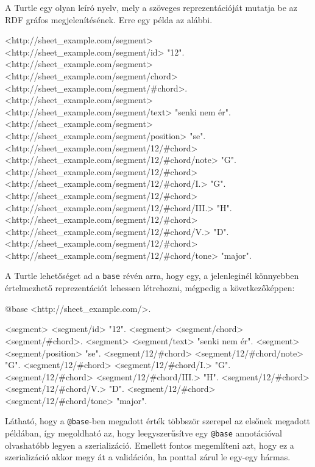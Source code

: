 A Turtle egy olyan leíró nyelv, mely a szöveges reprezentációját mutatja be az RDF gráfos megjelenítésének.
Erre egy példa az alábbi.
\begin{xml}
<http://sheet_example.com/segment> <http://sheet_example.com/segment/id> "12".
<http://sheet_example.com/segment> <http://sheet_example.com/segment/chord> <http://sheet_example.com/segment/#chord>.
<http://sheet_example.com/segment> <http://sheet_example.com/segment/text> "senki nem ér".
<http://sheet_example.com/segment> <http://sheet_example.com/segment/position> "se".
<http://sheet_example.com/segment/12/#chord> <http://sheet_example.com/segment/12/#chord/note> "G".
<http://sheet_example.com/segment/12/#chord> <http://sheet_example.com/segment/12/#chord/I.> "G".
<http://sheet_example.com/segment/12/#chord> <http://sheet_example.com/segment/12/#chord/III.> "H".
<http://sheet_example.com/segment/12/#chord> <http://sheet_example.com/segment/12/#chord/V.> "D".
<http://sheet_example.com/segment/12/#chord> <http://sheet_example.com/segment/12/#chord/tone> "major".
\end{xml}

A Turtle lehetőséget ad a \texttt{base} révén arra, hogy egy, a jelenleginél könnyebben értelmezhető reprezentációt lehessen létrehozni, mégpedig a következőképpen:
\begin{xml}
@base <http://sheet_example.com/>.

<segment> <segment/id> "12".
<segment> <segment/chord> <segment/#chord>.
<segment> <segment/text> "senki nem ér".
<segment> <segment/position> "se".
<segment/12/#chord> <segment/12/#chord/note> "G".
<segment/12/#chord> <segment/12/#chord/I.> "G".
<segment/12/#chord> <segment/12/#chord/III.> "H".
<segment/12/#chord> <segment/12/#chord/V.> "D".
<segment/12/#chord> <segment/12/#chord/tone> "major".
\end{xml}
Látható, hogy a \texttt{@base}-ben megadott érték többször szerepel az elsőnek megadott példában, így megoldható az, hogy leegyszerűsítve egy \texttt{@base} annotációval olvashatóbb legyen a szerializáció. Emellett fontos megemlíteni azt, hogy ez a szerializáció akkor megy át a validáción, ha ponttal zárul le egy-egy hármas.


